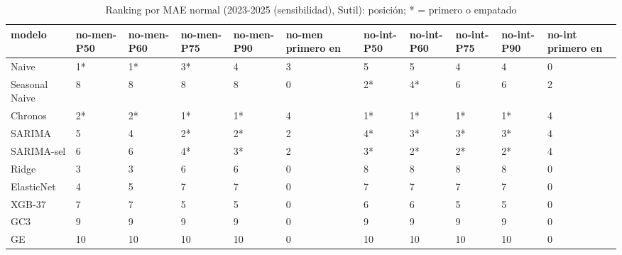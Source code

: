\begin{table}[H]
\centering
\small
\caption{Ranking por MAE normal (2023-2025 (sensibilidad), Sutil): posición; * = primero o empatado}
\label{tab:T08_ranking_normal_sensibilidad_2023_2025_sutil}
\begin{tabular}{lllllllllll}
\toprule
modelo & no-men-P50 & no-men-P60 & no-men-P75 & no-men-P90 & no-men primero en & no-int-P50 & no-int-P60 & no-int-P75 & no-int-P90 & no-int primero en \\
\midrule
Naive & 1* & 1* & 3* & 4 & 3 & 5 & 5 & 4 & 4 & 0 \\
Seasonal Naive & 8 & 8 & 8 & 8 & 0 & 2* & 4* & 6 & 6 & 2 \\
Chronos & 2* & 2* & 1* & 1* & 4 & 1* & 1* & 1* & 1* & 4 \\
SARIMA & 5 & 4 & 2* & 2* & 2 & 4* & 3* & 3* & 3* & 4 \\
SARIMA-sel & 6 & 6 & 4* & 3* & 2 & 3* & 2* & 2* & 2* & 4 \\
Ridge & 3 & 3 & 6 & 6 & 0 & 8 & 8 & 8 & 8 & 0 \\
ElasticNet & 4 & 5 & 7 & 7 & 0 & 7 & 7 & 7 & 7 & 0 \\
XGB-37 & 7 & 7 & 5 & 5 & 0 & 6 & 6 & 5 & 5 & 0 \\
GC3 & 9 & 9 & 9 & 9 & 0 & 9 & 9 & 9 & 9 & 0 \\
GE & 10 & 10 & 10 & 10 & 0 & 10 & 10 & 10 & 10 & 0 \\
\bottomrule
\end{tabular}
\end{table}